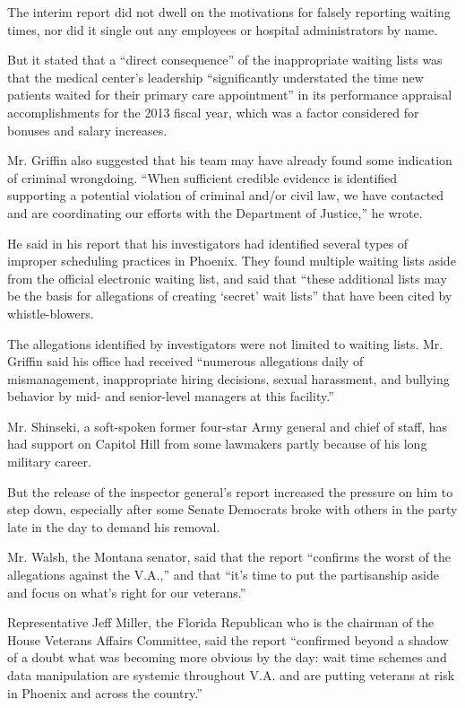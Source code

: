 The interim report did not dwell on the motivations for falsely
reporting waiting times, nor did it single out any employees or hospital
administrators by name.

But it stated that a ``direct consequence'' of the inappropriate waiting
lists was that the medical center's leadership ``significantly
understated the time new patients waited for their primary care
appointment'' in its performance appraisal accomplishments for the 2013
fiscal year, which was a factor considered for bonuses and salary
increases.

Mr. Griffin also suggested that his team may have already found some
indication of criminal wrongdoing. ``When sufficient credible evidence
is identified supporting a potential violation of criminal and/or civil
law, we have contacted and are coordinating our efforts with the
Department of Justice,'' he wrote.

He said in his report that his investigators had identified several
types of improper scheduling practices in Phoenix. They found multiple
waiting lists aside from the official electronic waiting list, and said
that ``these additional lists may be the basis for allegations of
creating `secret' wait lists'' that have been cited by whistle-blowers.

The allegations identified by investigators were not limited to waiting
lists. Mr. Griffin said his office had received ``numerous allegations
daily of mismanagement, inappropriate hiring decisions, sexual
harassment, and bullying behavior by mid- and senior-level managers at
this facility.''

Mr. Shinseki, a soft-spoken former four-star Army general and chief of
staff, has had support on Capitol Hill from some lawmakers partly
because of his long military career.

But the release of the inspector general's report increased the pressure
on him to step down, especially after some Senate Democrats broke with
others in the party late in the day to demand his removal.

Mr. Walsh, the Montana senator, said that the report ``confirms the
worst of the allegations against the V.A.,'' and that ``it's time to put
the partisanship aside and focus on what's right for our veterans.''

Representative Jeff Miller, the Florida Republican who is the chairman
of the House Veterans Affairs Committee, said the report ``confirmed
beyond a shadow of a doubt what was becoming more obvious by the day:
wait time schemes and data manipulation are systemic throughout V.A. and
are putting veterans at risk in Phoenix and across the country.''

